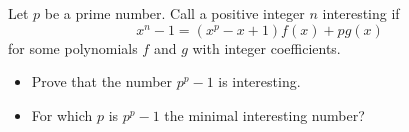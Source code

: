 Let \(p\) be a prime number. Call a positive integer \(n\) interesting if
\[x^n-1=(x^p-x+1)f(x)+pg(x)\]
for some polynomials \(f\) and \(g\) with integer coefficients.\begin{itemize}

\item[(a)] Prove that the number \(p^p-1\) is interesting.
\item[(b)] For which \(p\) is \(p^p-1\) the minimal interesting number?
\end{itemize}
